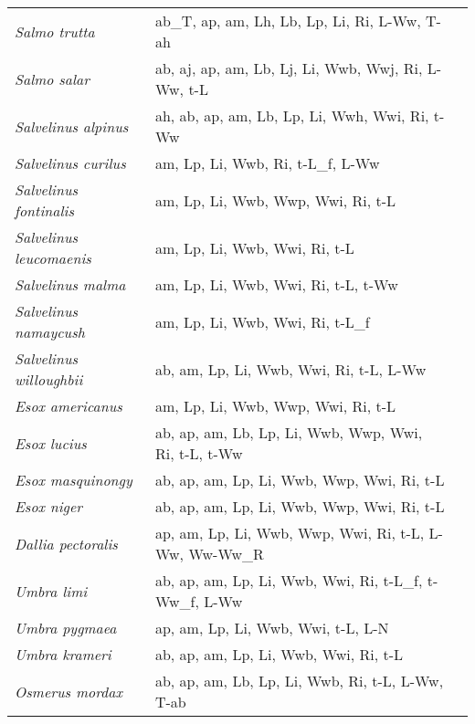 {\begin{longtable}[c]{p{3.5cm}p{5.5cm}p{5.5cm}}
\emph{Salmo trutta} &  ab\_T, ap, am, Lh, Lb, Lp, Li, Ri, L-Ww, T-ah & \citet{OjanBran2003,Elli1984,KlemAmun2003,Elli1994,Elli1975} \\
\emph{Salmo salar} &  ab, aj, ap, am, Lb, Lj, Li, Wwb, Wwj, Ri, L-Ww, t-L & \citet{Berg2001,Hutchings1998,Flower1935,VanLeeuwen2016,Fleming1996,Jutila2006,Thorpe1984,Einum2000,Sutton2000} \\
\emph{Salvelinus alpinus} &  ah, ab, ap, am, Lb, Lp, Li, Wwh, Wwi, Ri, t-Ww & \citet{YaniHisa2002,GrubWies1983} \\
\emph{Salvelinus curilus} &  am, Lp, Li, Wwb, Ri, t-L\_f, L-Ww & \citet{KolpKim2014} \\
\emph{Salvelinus fontinalis} &  am, Lp, Li, Wwb, Wwp, Wwi, Ri, t-L & \citet{OhluNord2008} \\
\emph{Salvelinus leucomaenis} &  am, Lp, Li, Wwb, Wwi, Ri, t-L & \citet{Mori2001} \\
\emph{Salvelinus malma} &  am, Lp, Li, Wwb, Wwi, Ri, t-L, t-Ww & \citet{Esin2015} \\
\emph{Salvelinus namaycush} &  am, Lp, Li, Wwb, Wwi, Ri, t-L\_f & \citet{MorbCout2010} \\
\emph{Salvelinus willoughbii} &  ab, am, Lp, Li, Wwb, Wwi, Ri, t-L, L-Ww & \citet{FrosKipl1980} \\
\emph{Esox americanus} &  am, Lp, Li, Wwb, Wwp, Wwi, Ri, t-L &  \\
\emph{Esox lucius} &  ab, ap, am, Lb, Lp, Li, Wwb, Wwp, Wwi, Ri, t-L, t-Ww & \citet{BregKenn1980,AndeNeum1996,ZiliZili2010} \\
\emph{Esox masquinongy} &  ab, ap, am, Lp, Li, Wwb, Wwp, Wwi, Ri, t-L & \citet{WallYeag1990,CranCorn2020} \\
\emph{Esox niger} &  ab, ap, am, Lp, Li, Wwb, Wwp, Wwi, Ri, t-L & \citet{WallYeag1990,CranCorn2020} \\
\emph{Dallia pectoralis} &  ap, am, Lp, Li, Wwb, Wwp, Wwi, Ri, t-L, L-Ww, Ww-Ww\_R & \citet{Blac1962} \\
\emph{Umbra limi} &  ab, ap, am, Lp, Li, Wwb, Wwi, Ri, t-L\_f, t-Ww\_f, L-Ww & \citet{WallYeag1990,RobiJirk2010} \\
\emph{Umbra pygmaea} &  ap, am, Lp, Li, Wwb, Wwi, t-L, L-N & \citet{PaneWeis2012} \\
\emph{Umbra krameri} &  ab, ap, am, Lp, Li, Wwb, Wwi, Ri, t-L & \citet{Kova1995} \\
\emph{Osmerus mordax} &  ab, ap, am, Lb, Lp, Li, Wwb, Ri, t-L, L-Ww, T-ab & \citet{QuigIgoe2004,MaitLyle2010,JoneMcCa2013} \\

\end{longtable}}

